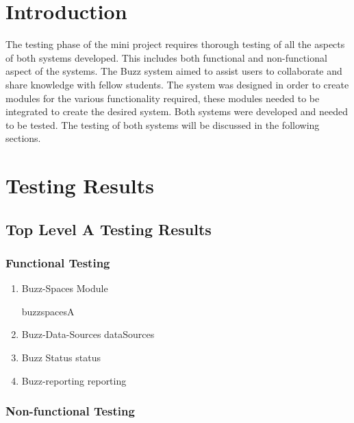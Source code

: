 \documentclass[hidelinks, 12pt, oneside]{article}
\begin{document}
\tableofcontents

\newpage

\section{Introduction}
The testing phase of the mini project requires thorough testing of all the aspects of both systems developed. This includes both functional and non-functional aspect of the systems. The Buzz system aimed to assist users to collaborate and share knowledge with fellow students. The system was designed in order to create modules for the various functionality required, these modules needed to be integrated to create the desired system. Both systems were developed and needed to be tested. The testing of both systems will be discussed in the following sections.

\section{Testing Results}
\subsection{Top Level A Testing Results}
\subsubsection{Functional Testing}
\begin {enumerate}
\item Buzz-Spaces Module

 {buzzspacesA}

\item Buzz-Data-Sources
 {dataSources}

\item Buzz Status
 {status}

\item Buzz-reporting
 {reporting}

\end {enumerate}
 
 

\subsubsection{Non-functional Testing} 
\end{document}
